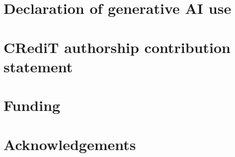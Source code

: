 \documentclass[review]{elsarticle}
\begin{document}
\section*{Declaration of generative AI use}

\section*{CRediT authorship contribution statement}

\section*{Funding}

\section*{Acknowledgements}


\end{document}
